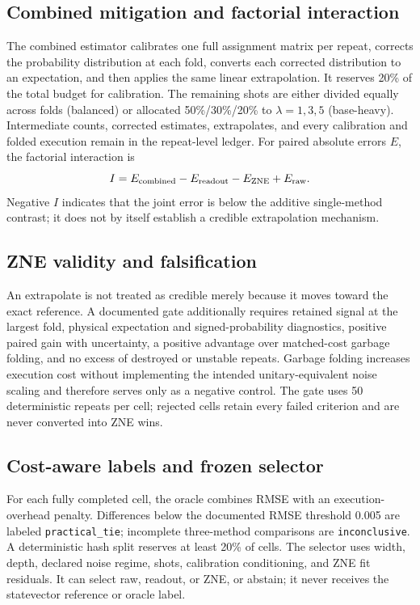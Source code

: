 \documentclass[10pt,twocolumn]{article}
\begin{document}
\subsection{Combined mitigation and factorial interaction}
The combined estimator calibrates one full assignment matrix per repeat, corrects
the probability distribution at each fold, converts each corrected distribution to
an expectation, and then applies the same linear extrapolation. It reserves 20\% of
the total budget for calibration. The remaining shots are either divided equally
across folds (balanced) or allocated 50\%/30\%/20\% to $\lambda=1,3,5$
(base-heavy). Intermediate counts, corrected estimates, extrapolates, and every
calibration and folded execution remain in the repeat-level ledger. For paired
absolute errors $E$, the factorial interaction is
\begin{equation}
I=E_{\rm combined}-E_{\rm readout}-E_{\rm ZNE}+E_{\rm raw}.
\end{equation}
Negative $I$ indicates that the joint error is below the additive single-method
contrast; it does not by itself establish a credible extrapolation mechanism.

\subsection{ZNE validity and falsification}
An extrapolate is not treated as credible merely because it moves toward the exact
reference. A documented gate additionally requires retained signal at the largest
fold, physical expectation and signed-probability diagnostics, positive paired gain
with uncertainty, a positive advantage over matched-cost garbage folding, and no
excess of destroyed or unstable repeats. Garbage folding increases execution cost
without implementing the intended unitary-equivalent noise scaling and therefore
serves only as a negative control. The gate uses 50 deterministic repeats per cell;
rejected cells retain every failed criterion and are never converted into ZNE wins.

\subsection{Cost-aware labels and frozen selector}
For each fully completed cell, the oracle combines RMSE with an execution-overhead
penalty. Differences below the documented RMSE threshold 0.005 are labeled
\texttt{practical\_tie}; incomplete three-method comparisons are
\texttt{inconclusive}. A deterministic hash split reserves at least 20\% of cells.
The selector uses width, depth, declared noise regime, shots, calibration
conditioning, and ZNE fit residuals. It can select raw, readout, or ZNE, or abstain;
it never receives the statevector reference or oracle label.
\end{document}
